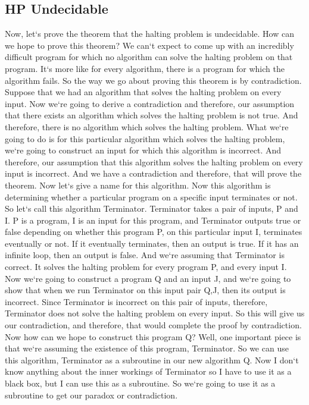 \subsection{HP  Undecidable}
Now, let`s prove the theorem that the halting problem is undecidable.
How can we hope to prove this theorem? We can`t expect to come up with an incredibly difficult program for which no algorithm can solve the halting problem on that program.
It`s more like for every algorithm, there is a program for which the algorithm fails.
So the way we go about proving this theorem is by contradiction.
Suppose that we had an algorithm that solves the halting problem on every input.
Now we`re going to derive a contradiction and therefore, our assumption that there exists an algorithm which solves the halting problem is not true.
And therefore, there is no algorithm which solves the halting problem.
What we`re going to do is for this particular algorithm which solves the halting problem, we`re going to construct an input for which this algorithm is incorrect.
And therefore, our assumption that this algorithm solves the halting problem on every input is incorrect.
And we have a contradiction and therefore, that will prove the theorem.
Now let`s give a name for this algorithm.
Now this algorithm is determining whether a particular program on a specific input terminates or not.
So let`s call this algorithm Terminator.
Terminator takes a pair of inputs, P and I\@.
P is a program, I is an input for this program, and Terminator outputs true or false depending on whether this program P, on this particular input I, terminates eventually or not.
If it eventually terminates, then an output is true.
If it has an infinite loop, then an output is false.
And we`re assuming that Terminator is correct.
It solves the halting problem for every program P, and every input I\@.
Now we`re going to construct a program Q and an input J, and we`re going to show that when we run Terminator on this input pair Q,J, then its output is incorrect.
Since Terminator is incorrect on this pair of inputs, therefore, Terminator does not solve the halting problem on every input.
So this will give us our contradiction, and therefore, that would complete the proof by contradiction.
Now how can we hope to construct this program Q? Well, one important piece is that we`re assuming the existence of this program, Terminator.
So we can use this algorithm, Terminator as a subroutine in our new algorithm Q\@.
Now I don`t know anything about the inner workings of Terminator so I have to use it as a black box, but I can use this as a subroutine.
So we`re going to use it as a subroutine to get our paradox or contradiction.

